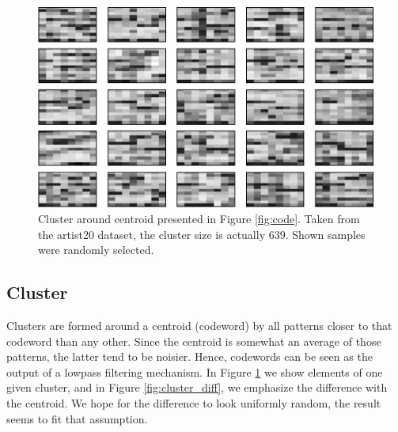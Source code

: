 \documentclass{article}
\begin{document}
\begin{figure}[htb]
\begin{center}
\includegraphics[width=.9\columnwidth]{close_patterns1}
\end{center}
\caption{\small{Cluster around centroid presented in
Figure \ref{fig:code}. Taken from the artist20 dataset, the cluster
size is actually $639$. Shown samples were randomly selected.
}}
\label{fig:cluster}
\end{figure}

\subsection{Cluster}
Clusters are formed around a centroid (codeword) by all patterns closer
to that codeword than any other. Since the centroid is somewhat an
average of those patterns, the latter tend to be noisier. Hence, codewords
can be seen as the output of a lowpass filtering mechanism.
In Figure \ref{fig:cluster} we show elements of one given
cluster, and in Figure \ref{fig:cluster_diff}, we emphasize the difference
with the centroid. We hope for the difference to look uniformly random,
the result seems to fit that assumption.

\end{document}
